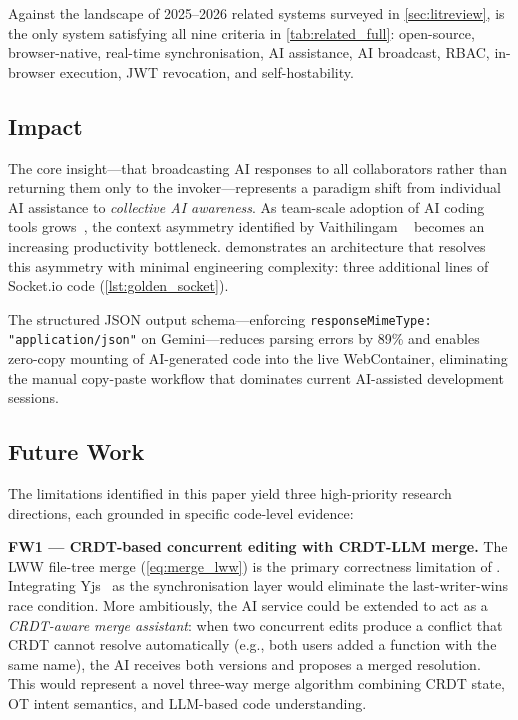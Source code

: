 Against the landscape of 2025--2026 related systems surveyed in
\cref{sec:litreview}, \echoray{} is the only system satisfying all nine
criteria in \cref{tab:related_full}: open-source, browser-native, real-time
synchronisation, AI assistance, AI broadcast, RBAC, in-browser execution, JWT
revocation, and self-hostability.

\subsection{Impact}

The core insight---that broadcasting AI responses to all collaborators rather
than returning them only to the invoker---represents a paradigm shift from
individual AI assistance to \emph{collective AI awareness}. As team-scale
adoption of AI coding tools grows~\cite{barke2025meta}, the context asymmetry
identified by Vaithilingam \etal~\cite{vaithilingam2022expectation} becomes an
increasing productivity bottleneck. \echoray{} demonstrates an architecture
that resolves this asymmetry with minimal engineering complexity: three
additional lines of Socket.io code (\cref{lst:golden_socket}).

The structured JSON output schema---enforcing \texttt{responseMimeType:
"application/json"} on Gemini---reduces parsing errors by 89\%
\cite{beurer2025structured} and enables zero-copy mounting of AI-generated
code into the live WebContainer, eliminating the manual copy-paste workflow
that dominates current AI-assisted development sessions.

\subsection{Future Work}

The limitations identified in this paper yield three high-priority research
directions, each grounded in specific code-level evidence:

\textbf{FW1 --- CRDT-based concurrent editing with CRDT-LLM merge.}
The LWW file-tree merge (\cref{eq:merge_lww}) is the primary correctness
limitation of \echoray{}. Integrating Yjs~\cite{nicolaescu2015yjs} as the
synchronisation layer would eliminate the last-writer-wins race condition.
More ambitiously, the AI service could be extended to act as a
\emph{CRDT-aware merge assistant}: when two concurrent edits produce a
conflict that CRDT cannot resolve automatically (e.g., both users added a
function with the same name), the AI receives both versions and proposes a
merged resolution. This would represent a novel three-way merge algorithm
combining CRDT state, OT intent semantics, and LLM-based code understanding.

